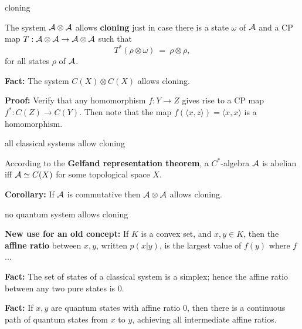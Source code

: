 \documentclass[8pt]{beamer}
\begin{document}
\begin{frame}{cloning}

  The system $\mathcal A\otimes\mathcal A$ allows \textbf{cloning} just in case
  there is a state $\omega$ of $\mathcal A$ and a CP map
  $T:\mathcal A\otimes\mathcal A\to\mathcal A\otimes\mathcal A$ such that
$$ T^*(\rho\otimes\omega ) \: = \: \rho\otimes\rho ,$$
for all states $\rho$ of $\mathcal A$.

\bigskip \textbf{Fact:} The system $C(X)\otimes C(X)$ allows cloning.

\smallskip \textbf{Proof:} Verify that any homomorphism $f:Y\to Z$
gives rise to a CP map $f^*:C(Z)\to C(Y)$.  Then note that the map
$f(\langle x,z\rangle )=\langle x,x\rangle$ is a homomorphism.



\end{frame}



\begin{frame}{all classical systems allow cloning}

  According to the \textbf{Gelfand representation theorem}, a
  $C^*$-algebra $\mathcal A$ is abelian iff $\mathcal A\simeq C(X)$ for some
  topological space $X$.

  \bigskip \textbf{Corollary:} If $\mathcal A$ is commutative then
  $\mathcal A\otimes\mathcal A$ allows cloning.



\end{frame}

\begin{frame}{no quantum system allows cloning}

  \textbf{New use for an old concept:} If $K$ is a convex set, and
  $x,y\in K$, then the \textbf{affine ratio} between $x,y$, written
  $p(x|y)$, is the largest value of $f(y)$ where $f$  ... 

  \bigskip \textbf{Fact:} The set of states of a classical system is a
  simplex; hence the affine ratio between any two pure states is $0$.

  \bigskip \textbf{Fact:} If $x,y$ are quantum states with affine
  ratio $0$, then there is a continuous path of quantum states from
  $x$ to $y$, achieving all intermediate affine ratios.






\end{frame}
\end{document}
